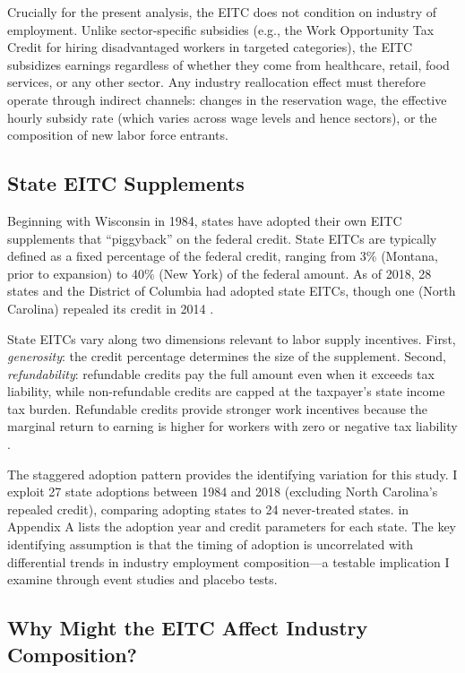 \documentclass[12pt]{article}
\begin{document}
Crucially for the present analysis, the EITC does not condition on industry of employment. Unlike sector-specific subsidies (e.g., the Work Opportunity Tax Credit for hiring disadvantaged workers in targeted categories), the EITC subsidizes earnings regardless of whether they come from healthcare, retail, food services, or any other sector. Any industry reallocation effect must therefore operate through indirect channels: changes in the reservation wage, the effective hourly subsidy rate (which varies across wage levels and hence sectors), or the composition of new labor force entrants.

\subsection{State EITC Supplements}

Beginning with Wisconsin in 1984, states have adopted their own EITC supplements that ``piggyback'' on the federal credit. State EITCs are typically defined as a fixed percentage of the federal credit, ranging from 3\% (Montana, prior to expansion) to 40\% (New York) of the federal amount. As of 2018, 28 states and the District of Columbia had adopted state EITCs, though one (North Carolina) repealed its credit in 2014 \citep{williams2019}.

State EITCs vary along two dimensions relevant to labor supply incentives. First, \textit{generosity}: the credit percentage determines the size of the supplement. Second, \textit{refundability}: refundable credits pay the full amount even when it exceeds tax liability, while non-refundable credits are capped at the taxpayer's state income tax burden. Refundable credits provide stronger work incentives because the marginal return to earning is higher for workers with zero or negative tax liability \citep{bastian2021}.

The staggered adoption pattern provides the identifying variation for this study. I exploit 27 state adoptions between 1984 and 2018 (excluding North Carolina's repealed credit), comparing adopting states to 24 never-treated states.  in Appendix A lists the adoption year and credit parameters for each state. The key identifying assumption is that the timing of adoption is uncorrelated with differential trends in industry employment composition---a testable implication I examine through event studies and placebo tests.

\subsection{Why Might the EITC Affect Industry Composition?}
\end{document}
